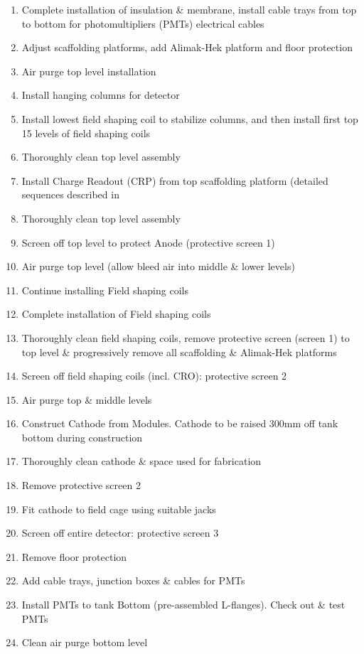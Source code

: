\begin{enumerate}
\item{Complete installation of insulation \& membrane, install cable trays from top to bottom for photomultipliers (PMTs) electrical cables}
\item{Adjust scaffolding platforms, add Alimak-Hek platform and floor protection}
\item{Air purge top level installation}
\item{Install hanging columns for detector}
\item{Install lowest field shaping coil to stabilize columns, and then install first top 15 levels of field shaping coils}
\item{Thoroughly clean top level assembly}
\item{Install Charge Readout (CRP) from top scaffolding platform (detailed sequences described in \anxlbnob }
\item{Thoroughly clean top level assembly}
\item{Screen off top level to protect Anode (protective screen 1)}
\item{Air purge top level (allow bleed air into middle \& lower levels)}
\item{Continue installing Field shaping coils}
\item{Complete installation of Field shaping coils}
\item{Thoroughly clean field shaping coils, remove protective screen (screen 1) to top level \& progressively remove all scaffolding \& Alimak-Hek platforms}
\item{Screen off field shaping coils (incl. CRO): protective screen 2}
\item{Air purge top \& middle levels}
\item{Construct Cathode from Modules. Cathode to be raised 300mm off tank bottom during construction}
\item{Thoroughly clean cathode \& space used for fabrication}
\item{Remove protective screen 2}
\item{Fit cathode to field cage using suitable jacks}
\item{Screen off entire detector: protective screen 3}
\item{Remove floor protection}
\item{Add cable trays, junction boxes \& cables for PMTs}
\item{Install PMTs to tank Bottom (pre-assembled L-flanges). Check out \& test PMTs}
\item{Clean air purge bottom level}

\end{enumerate}
